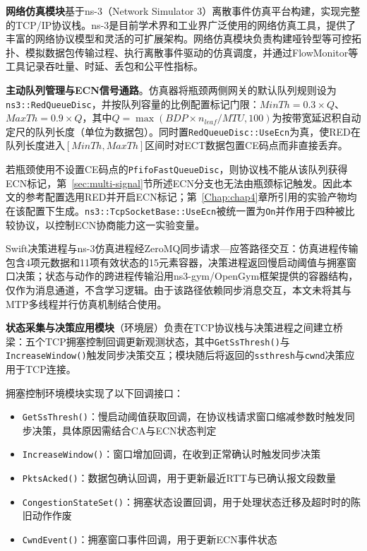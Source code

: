\textbf{网络仿真模块}基于ns-3（Network Simulator 3）离散事件仿真平台构建，实现完整的TCP/IP协议栈。ns-3是目前学术界和工业界广泛使用的网络仿真工具，提供了丰富的网络协议模型和灵活的可扩展架构。网络仿真模块负责构建哑铃型等可控拓扑、模拟数据包传输过程、执行离散事件驱动的仿真调度，并通过FlowMonitor等工具记录吞吐量、时延、丢包和公平性指标。

\textbf{主动队列管理与ECN信号通路}。仿真器将瓶颈两侧网关的默认队列规则设为\texttt{ns3::RedQueueDisc}，并按队列容量的比例配置标记门限：$MinTh = 0.3 \times Q$、$MaxTh = 0.9 \times Q$，其中$Q = \max(BDP \times n_{leaf} / MTU, 100)$为按带宽延迟积自动定尺的队列长度（单位为数据包）。同时置\texttt{RedQueueDisc::UseEcn}为真，使RED在队列长度进入$[MinTh, MaxTh]$区间时对ECT数据包置CE码点而非直接丢弃。

若瓶颈使用不设置CE码点的\texttt{PfifoFastQueueDisc}，则协议栈不能从该队列获得ECN标记，第~\ref{sec:multi-signal}节所述ECN分支也无法由瓶颈标记触发。因此本文的参考配置选用RED并开启ECN标记；第~\ref{Chap:chap4}章所引用的实验产物均在该配置下生成。\texttt{ns3::TcpSocketBase::UseEcn}被统一置为\texttt{On}并作用于四种被比较协议，以控制ECN协商能力这一实验变量。

Swift决策进程与ns-3仿真进程经ZeroMQ同步请求—应答路径交互：仿真进程传输包含4项元数据和11项有效状态的15元素容器，决策进程返回慢启动阈值与拥塞窗口决策；状态与动作的跨进程传输沿用ns3-gym/OpenGym框架提供的容器结构，仅作为消息通道，不含学习逻辑。由于该路径依赖同步消息交互，本文未将其与MTP多线程并行仿真机制结合使用。

\textbf{状态采集与决策应用模块}（环境层）负责在TCP协议栈与决策进程之间建立桥梁：五个TCP拥塞控制回调更新观测状态，其中\texttt{GetSsThresh()}与\texttt{IncreaseWindow()}触发同步决策交互；模块随后将返回的\texttt{ssthresh}与\texttt{cwnd}决策应用于TCP连接。

拥塞控制环境模块实现了以下回调接口：

\begin{itemize}
    \item \texttt{GetSsThresh()}：慢启动阈值获取回调，在协议栈请求窗口缩减参数时触发同步决策，具体原因需结合CA与ECN状态判定
    \item \texttt{IncreaseWindow()}：窗口增加回调，在收到正常确认时触发同步决策
    \item \texttt{PktsAcked()}：数据包确认回调，用于更新最近RTT与已确认报文段数量
    \item \texttt{CongestionStateSet()}：拥塞状态设置回调，用于处理状态迁移及超时时的陈旧动作作废
    \item \texttt{CwndEvent()}：拥塞窗口事件回调，用于更新ECN事件状态
\end{itemize}

